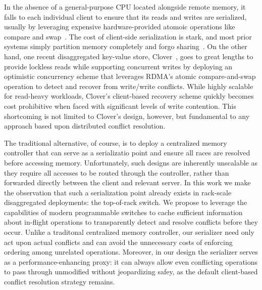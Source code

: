 

In the absence of a general-purpose CPU located alongside remote
memory, it falls to each individual client to ensure that its reads
and writes are serialized, usually by leveraging expensive
hardware-provided atomoic operations like compare and
swap~\cite{design-guidelines,clover}.  The cost of client-side
serialization is stark, and most prior systems simply partition memory
completely and forgo sharing~\cite{reigons,fastswap, legoos}.  On the
other hand, one recent disaggregated key-value store,
Clover~\cite{clover}, goes to great lengths to provide lockless reads
while supporting concurrent writes by deploying an optimistic
concurrency scheme that leverages RDMA's atomic compare-and-swap
operation to detect and recover from write/write conflicts.  While
highly scalable for read-heavy workloads, Clover's client-based
recovery scheme quickly becomes cost prohibitive when faced with
significant levels of write contention.  This shortcoming is not
limited to Clover's design, however, but fundamental to any approach
based upon distributed conflict resolution.


The traditional alternative, of course, is to deploy a centralized
memory controller that can serve as a serializatio point and ensure
all races are resolved before accessing memory.  Unfortunately, such
designs are inherently unscalable as they require all accesses to be
routed through the controller, rather than forwarded directly between
the client and relevant server.  In this work we make the observation
that such a serialization point already exists in rack-scale
disaggregated deployments: the top-of-rack switch.  We propose to
leverage the capabilities of modern programmable switches to cache
sufficient information about in-flight operations to transparently
detect and resolve conflicts before they occur.  Unlike a traditonal
centralized memory controller, our serializer need only act upon
actual conflicts and can avoid the unnecessary costs of enforcing
ordering among unrelated operations.  Moreover, in our design the
serializer serves as a performance-enhancing proxy: it can always
allow even conflicting operations to pass through unmodified without
jeopardizing safey, as the default client-based conflict resolution
strategy remains.

